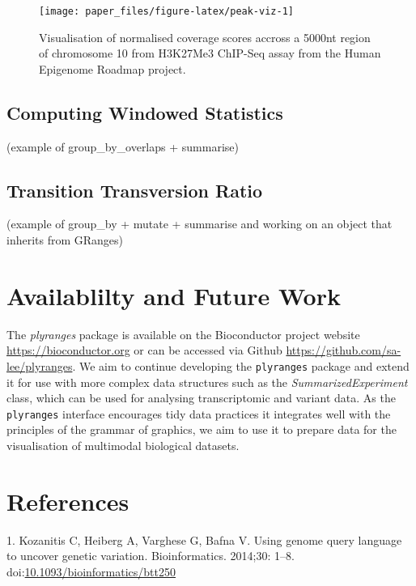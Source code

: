 \documentclass[10pt,letterpaper]{article}
\begin{document}
\begin{figure}

{\centering \texttt{[image: paper\_files/figure-latex/peak-viz-1]} 

}

\caption{Visualisation of normalised coverage scores accross a 5000nt region of chromosome 10 from H3K27Me3 ChIP-Seq assay from the Human Epigenome Roadmap project.}\label{fig:peak-viz}
\end{figure}

\subsection{Computing Windowed
Statistics}\label{computing-windowed-statistics}

(example of group\_by\_overlaps + summarise)

\subsection{Transition Transversion
Ratio}\label{transition-transversion-ratio}

(example of group\_by + mutate + summarise and working on an object that
inherits from GRanges)

\section{Availablilty and Future
Work}\label{availablilty-and-future-work}

The \emph{plyranges} package is available on the Bioconductor project
website \url{https://bioconductor.org} or can be accessed via Github
\url{https://github.com/sa-lee/plyranges}. We aim to continue developing
the \texttt{plyranges} package and extend it for use with more complex
data structures such as the \emph{SummarizedExperiment} class, which can
be used for analysing transcriptomic and variant data. As the
\texttt{plyranges} interface encourages tidy data practices it
integrates well with the principles of the grammar of graphics, we aim
to use it to prepare data for the visualisation of multimodal biological
datasets.

\section*{References}\label{references}

\hypertarget{refs}{}
\hypertarget{ref-Kozanitis2014-va}{}
1. Kozanitis C, Heiberg A, Varghese G, Bafna V. Using genome query
language to uncover genetic variation. Bioinformatics. 2014;30: 1--8.
doi:\href{https://doi.org/10.1093/bioinformatics/btt250}{10.1093/bioinformatics/btt250}
\end{document}

